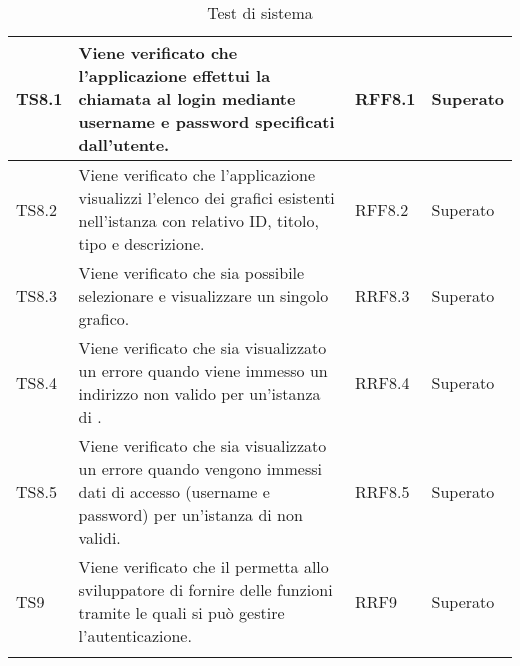 \begin{longtabu}{| X[0.5] | X | X[0.5] | X[0.4] |}
TS8.1 & Viene verificato che l'applicazione effettui la chiamata al login mediante username e password specificati dall'utente. & RFF8.1 & Superato\\ \hline

TS8.2 & Viene verificato che l'applicazione visualizzi l'elenco dei grafici esistenti nell'istanza  con relativo ID, titolo, tipo e descrizione. & RFF8.2 & Superato\\ \hline

TS8.3 & Viene verificato che sia possibile selezionare e visualizzare un singolo grafico. & RRF8.3 & Superato\\ \hline

TS8.4 & Viene verificato che sia visualizzato un errore quando viene immesso un indirizzo non valido per un'istanza di . & RRF8.4 & Superato\\ \hline

TS8.5 & Viene verificato che sia visualizzato un errore quando vengono immessi dati di accesso (username e password) per un'istanza di  non validi. & RRF8.5 & Superato\\ \hline

TS9 & Viene verificato che il  permetta allo sviluppatore di fornire delle funzioni tramite le quali si può gestire l'autenticazione. & RRF9 & Superato\\ \hline

\caption{Test di sistema}

\end{longtabu}
